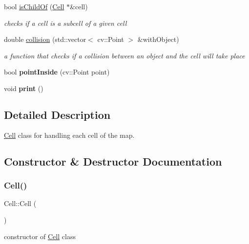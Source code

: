 \begin{DoxyCompactItemize}
bool \mbox{\hyperlink{class_cell_a136f724c1730f551b7533f5840c9c393}{is\+Child\+Of}} (\mbox{\hyperlink{class_cell}{Cell}} $\ast$\&cell)
\begin{DoxyCompactList}\small\item\em checks if a cell is a subcell of a given cell \end{DoxyCompactList}\item 
double \mbox{\hyperlink{class_cell_acc1faa0802609404e8058263004087ea}{collision}} (std\+::vector$<$ cv\+::\+Point $>$ \&with\+Object)
\begin{DoxyCompactList}\small\item\em a function that checks if a collision between an object and the cell will take place \end{DoxyCompactList}\item 
\mbox{\label{class_cell_a984dff9c5002abe33e18b9d866e4885e}} 
bool {\bfseries point\+Inside} (cv\+::\+Point point)
\item 
\mbox{\label{class_cell_ad85f38ac8740c33451866c8af37b8240}} 
void {\bfseries print} ()
\end{DoxyCompactItemize}


\subsection{Detailed Description}
\mbox{\hyperlink{class_cell}{Cell}} class for handling each cell of the map. 

\subsection{Constructor \& Destructor Documentation}
\mbox{\label{class_cell_a394510643e8664cf12b5efaf5cb99f71}} 
\subsubsection{\texorpdfstring{Cell()}{Cell()}}
{\footnotesize\ttfamily Cell\+::\+Cell (\begin{DoxyParamCaption}{ }\end{DoxyParamCaption})}

constructor of \mbox{\hyperlink{class_cell}{Cell}} class \mbox{\label{class_cell_a9fa559f7a28e2b4336c6879ca09304d8}} 
